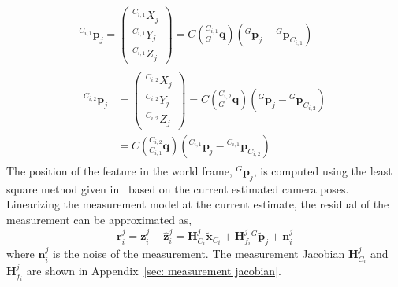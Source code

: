 \begin{equation*}
\begin{gathered}
{}^{C_{i, 1}}\mathbf{p}_j = 
\begin{pmatrix}
{}^{C_{i, 1}}X_j \\ {}^{C_{i, 1}}Y_j \\ {}^{C_{i, 1}}Z_j
\end{pmatrix} = 
C\left({}^{C_{i, 1}}_G\mathbf{q}\right)
\left({}^G\mathbf{p}_j-{}^G\mathbf{p}_{C_{i, 1}}\right) \\
\begin{aligned}
{}^{C_{i, 2}}\mathbf{p}_j &= 
\begin{pmatrix}
{}^{C_{i, 2}}X_j \\ {}^{C_{i, 2}}Y_j \\ {}^{C_{i, 2}}Z_j
\end{pmatrix} = 
C\left({}^{C_{i, 2}}_G\mathbf{q}\right)
\left({}^G\mathbf{p}_j-{}^G\mathbf{p}_{C_{i, 2}}\right) \\
&= C\left({}^{C_{i, 2}}_{C_{i, 1}}\mathbf{q}\right)
\left({}^{C_{i, 1}}\mathbf{p}_j - 
{}^{C_{i, 1}}\mathbf{p}_{C_{i, 2}}\right)
\end{aligned}
\end{gathered}
\end{equation*} 
The position of the feature in the world frame, ${}^G\mathbf{p}_j$, is 
computed using the least square method given in~\cite{mourikis2007multi} based on the current estimated camera poses. Linearizing the measurement model at the current estimate, the residual of the measurement can be approximated as,
\begin{equation}
\label{eq: error measurement model}
\mathbf{r}^j_i = 
\mathbf{z}_i^j - \hat{\mathbf{z}}_i^j = 
\mathbf{H}_{C_i}^j\tilde{\mathbf{x}}_{C_i} + 
\mathbf{H}_{f_i}^j{}^G\tilde{\mathbf{p}}_{j} + 
\mathbf{n}_i^j
\end{equation}
where $\mathbf{n}_i^j$ is the noise of the measurement. The measurement Jacobian $\mathbf{H}_{C_i}^j$ and $\mathbf{H}_{f_i}^j$ are shown in Appendix~\ref{sec: measurement jacobian}.

